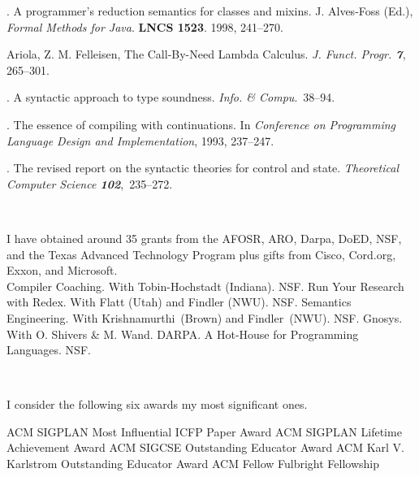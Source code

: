 \documentclass[11pt]{article}
\begin{document}
.
 A programmer's reduction semantics for classes and mixins. 
 J. Alves-Foss (Ed.), {\it Formal Methods for Java\/}.
 {\bf LNCS 1523}. 1998, 241--270.

Ariola, Z. M. Felleisen, 
 The Call-By-Need Lambda Calculus.
 {\it J. Funct. Progr. \bf7\/}, 265--301.

.
 A syntactic approach to type soundness.  {\it Info. \& Compu}.~38--94.

.  The
essence of compiling with continuations.  In {\it Conference on
Programming Language Design and Implementation}, 1993, 237--247.

.
The revised report on the syntactic theories for control and state.
{\it Theoretical Computer Science \bf102},~235--272.

\bigskip

\noindent\hrulefill\\\noindent
{} 

\noindent I have obtained around 35 grants from the AFOSR, ARO, Darpa,
DoED, NSF, and the Texas Advanced Technology Program plus gifts from Cisco,
Cord.org, Exxon, and Microsoft. \\

Compiler Coaching. With Tobin-Hochstadt (Indiana). NSF. 
Run Your Research with Redex. With Flatt (Utah) and Findler (NWU). NSF. 
Semantics Engineering. With Krishnamurthi~(Brown) and Findler~(NWU). NSF. 
Gnosys. With O. Shivers \& M. Wand. DARPA.
A Hot-House for Programming Languages. NSF. 

\bigskip

\noindent\hrulefill\\\noindent
{}

\noindent I consider the following six awards my most significant ones.  

ACM SIGPLAN Most Influential ICFP Paper Award 
ACM SIGPLAN Lifetime Achievement Award 
ACM SIGCSE Outstanding Educator Award 
ACM Karl V. Karlstrom Outstanding Educator Award 
ACM Fellow 
Fulbright Fellowship
\end{document}
